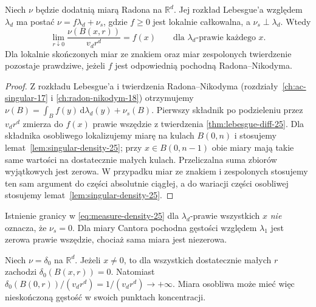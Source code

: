 \begin{twierdzenie}
\label{thm:measure-differentiation-25}
Niech $\nu$ będzie dodatnią miarą Radona na
$\mathbb R^d$. Jej rozkład Lebesgue'a względem
$\lambda_d$ ma postać $\nu=f\lambda_d+\nu_s$,
gdzie $f\ge0$ jest lokalnie całkowalna, a
$\nu_s\perp\lambda_d$. Wtedy
\begin{equation}\label{eq:measure-density-25}
 \lim_{r\downarrow0}\frac{\nu(B(x,r))}{v_dr^d}
 =f(x)\qquad\text{dla }\lambda_d\text{-prawie każdego }x.
\end{equation}
Dla lokalnie skończonych miar ze znakiem oraz miar
zespolonych twierdzenie pozostaje prawdziwe, jeżeli
$f$ jest odpowiednią pochodną Radona--Nikodyma.
\end{twierdzenie}
\begin{proof}
Z rozkładu Lebesgue'a i twierdzenia Radona--Nikodyma
(rozdziały~\ref{ch:ac-singular-17} i
\ref{ch:radon-nikodym-18}) otrzymujemy
$\nu(B)=\int_Bf(y)\,\mathrm d\lambda_d(y)+\nu_s(B)$.
Pierwszy składnik po podzieleniu przez $v_dr^d$
zmierza do $f(x)$ prawie wszędzie z twierdzenia
\ref{thm:lebesgue-diff-25}. Dla składnika osobliwego
lokalizujemy miarę na kulach $B(0,n)$ i stosujemy
lemat~\ref{lem:singular-density-25}; przy
$x\in B(0,n-1)$ obie miary mają takie same wartości
na dostatecznie małych kulach. Przeliczalna suma
zbiorów wyjątkowych jest zerowa. W przypadku miar ze
znakiem i zespolonych stosujemy ten sam argument do
części absolutnie ciągłej, a do wariacji części osobliwej
stosujemy lemat~\ref{lem:singular-density-25}.
\end{proof}

\begin{uwaga}
Istnienie granicy w \eqref{eq:measure-density-25} dla
$\lambda_d$-prawie wszystkich $x$ \emph{nie} oznacza,
że $\nu_s=0$. Dla miary Cantora pochodna gęstości
względem $\lambda_1$ jest zerowa prawie wszędzie,
chociaż sama miara jest niezerowa.
\end{uwaga}

\begin{przyklad}
Niech $\nu=\delta_0$ na $\mathbb R^d$. Jeżeli $x\ne0$,
to dla wszystkich dostatecznie małych $r$ zachodzi
$\delta_0(B(x,r))=0$. Natomiast
$\delta_0(B(0,r))/(v_dr^d)=1/(v_dr^d)\to+\infty$.
Miara osobliwa może mieć więc nieskończoną gęstość
w swoich punktach koncentracji.
\end{przyklad}

